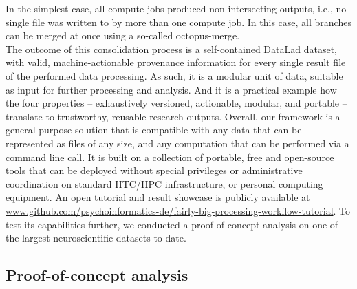 In the simplest case, all compute jobs produced non-intersecting outputs, i.e., no single file was written to by more than one compute job.
In this case, all branches can be merged at once using a so-called octopus-merge.\\
The outcome of this consolidation process is a self-contained DataLad dataset, with valid, machine-actionable provenance information for every single result file of the performed data processing.
As such, it is a modular unit of data, suitable as input for further processing and analysis.
And it is a practical example how the four properties -- exhaustively versioned, actionable, modular, and portable -- translate to trustworthy, reusable research outputs.
Overall, our framework is a general-purpose solution that is compatible with any data that can be represented as files of any size, and any computation that can be performed via a command line call. It is built on a collection of portable, free and open-source tools that can be deployed without special privileges or administrative coordination on standard HTC/HPC infrastructure, or personal computing equipment.
An open tutorial and result showcase is publicly available at \url{www.github.com/psychoinformatics-de/fairly-big-processing-workflow-tutorial}.
To test its capabilities further, we conducted a proof-of-concept analysis on one of the largest neuroscientific datasets to date.




\subsection{Proof-of-concept analysis}

